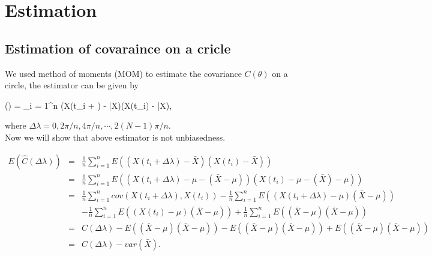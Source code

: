 \section{Estimation}

\subsection{Estimation of covaraince on a cricle} \label{est_covariance}

We used method of moments (MOM) to estimate the covariance $C(\theta)$ on a circle, the estimator can be given by

\beq \label{covarince_estimator}
(\Delta \lambda) = \sum_{i = 1}^n (X(t_i + \Delta \lambda) - \bar{X})(X(t_i) - \bar{X}), 
\eeq

where $\Delta \lambda = 0, 2\pi/n, 4\pi/n, \cdots, 2(N-1)\pi/n$.\\

Now we will show that above estimator is not unbiasedness.

\begin{eqnarray}
	\nonumber
	E(\hat{C}(\Delta \lambda)) &=& \frac{1}{n}\sum_{i = 1}^n E((X(t_i + \Delta \lambda) - \bar{X})(X(t_i) - \bar{X})) \\ \nonumber
	&=& \frac{1}{n}\sum_{i = 1}^n E((X(t_i + \Delta \lambda) - \mu - (\bar{X} - \mu))(X(t_i) -\mu - (\bar{X}) - \mu)) \\ \nonumber
	&=& \frac{1}{n}\sum_{i=1}^n cov(X(t_i+\Delta \lambda), X(t_i)) - \frac{1}{n}\sum_{i = 1}^n E((X(t_i + \Delta \lambda) - \mu)(\bar{X} - \mu)) \\ \nonumber
	& & -\frac{1}{n}\sum_{i = 1}^n E((X(t_i) - \mu)(\bar{X} - \mu)) + \frac{1}{n}\sum_{i = 1}^n E((\bar{X} - \mu)(\bar{X} - \mu)) \\ \nonumber
	&=& C(\Delta \lambda) -E((\bar{X} - \mu)(\bar{X} - \mu)) - E((\bar{X} - \mu)(\bar{X} - \mu)) + E((\bar{X} - \mu)(\bar{X} - \mu)) \\ 
	&=& C(\Delta \lambda) - var(\bar{X}).
\end{eqnarray}

